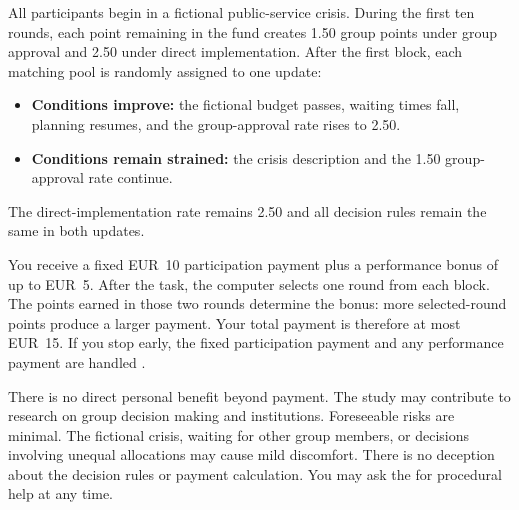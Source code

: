 \begin{infobox}
All participants begin in a fictional public-service crisis. During the first ten rounds, each point remaining in the fund creates 1.50 group points under group approval and 2.50 under direct implementation. After the first block, each matching pool is randomly assigned to one update:
\begin{itemize}
  \item \textbf{Conditions improve:} the fictional budget passes, waiting times fall, planning resumes, and the group-approval rate rises to 2.50.
  \item \textbf{Conditions remain strained:} the crisis description and the 1.50 group-approval rate continue.
\end{itemize}
The direct-implementation rate remains 2.50 and all decision rules remain the same in both updates.
\end{infobox}

You receive a fixed EUR~10 participation payment plus a performance bonus of up to EUR~5. After the task, the computer selects one round from each block. The points earned in those two rounds determine the bonus: more selected-round points produce a larger payment.  Your total payment is therefore at most EUR~15. If you stop early, the fixed participation payment and any performance payment are handled . 

There is no direct personal benefit beyond payment. The study may contribute to research on group decision making and institutions. Foreseeable risks are minimal. The fictional crisis, waiting for other group members, or decisions involving unequal allocations may cause mild discomfort. There is no deception about the decision rules or payment calculation. You may ask the  for procedural help at any time.

